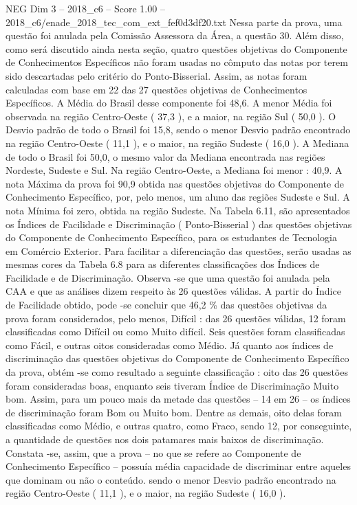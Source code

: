 \begin{textsample}{NEG Dim 3 – 2018\_c6 – Score 1.00 – 2018\_c6/enade\_2018\_tec\_com\_ext\_fef0d3df20.txt}
Nessa parte da prova, uma questão foi anulada pela Comissão Assessora da Área, a questão 30.
Além disso, como será discutido ainda nesta seção, quatro questões objetivas do Componente de Conhecimentos Específicos não foram usadas no cômputo das notas por terem sido descartadas pelo critério do Ponto-Bisserial.
Assim, as notas foram calculadas com base em 22 das 27 questões objetivas de Conhecimentos Específicos.
A Média do Brasil desse componente foi 48,6.
A menor Média foi observada na região Centro-Oeste ( 37,3 ), e a maior, na região Sul ( 50,0 ).
O Desvio padrão de todo o Brasil foi 15,8, sendo o menor Desvio padrão encontrado na região Centro-Oeste ( 11,1 ), e o maior, na região Sudeste ( 16,0 ).
A Mediana de todo o Brasil foi 50,0, o mesmo valor da Mediana encontrada nas regiões Nordeste, Sudeste e Sul.
Na região Centro-Oeste, a Mediana foi menor : 40,9.
A nota Máxima da prova foi 90,9 obtida nas questões objetivas do Componente de Conhecimento Específico, por, pelo menos, um aluno das regiões Sudeste e Sul.
A nota Mínima foi zero, obtida na região Sudeste.
Na Tabela 6.11, são apresentados os Índices de Facilidade e Discriminação ( Ponto-Bisserial ) das questões objetivas do Componente de Conhecimento Específico, para os estudantes de Tecnologia em Comércio Exterior.
Para facilitar a diferenciação das questões, serão usadas as mesmas cores da Tabela 6.8 para as diferentes classificações dos Índices de Facilidade e de Discriminação.
Observa -se que uma questão foi anulada pela CAA e que as análises dizem respeito às 26 questões válidas.
A partir do Índice de Facilidade obtido, pode -se concluir que 46,2 \% das questões objetivas da prova foram considerados, pelo menos, Difícil : das 26 questões válidas, 12 foram classificadas como Difícil ou como Muito difícil.
Seis questões foram classificadas como Fácil, e outras oitos consideradas como Médio.
Já quanto aos índices de discriminação das questões objetivas do Componente de Conhecimento Específico da prova, obtém -se como resultado a seguinte classificação : oito das 26 questões foram consideradas boas, enquanto seis tiveram Índice de Discriminação Muito bom.
Assim, para um pouco mais da metade das questões – 14 em 26 – os índices de discriminação foram Bom ou Muito bom.
Dentre as demais, oito delas foram classificadas como Médio, e outras quatro, como Fraco, sendo 12, por conseguinte, a quantidade de questões nos dois patamares mais baixos de discriminação.
Constata -se, assim, que a prova – no que se refere ao Componente de Conhecimento Específico – possuía média capacidade de discriminar entre aqueles que dominam ou não o conteúdo. sendo o menor Desvio padrão encontrado na região Centro-Oeste ( 11,1 ), e o maior, na região Sudeste ( 16,0 ).

\end{textsample}
